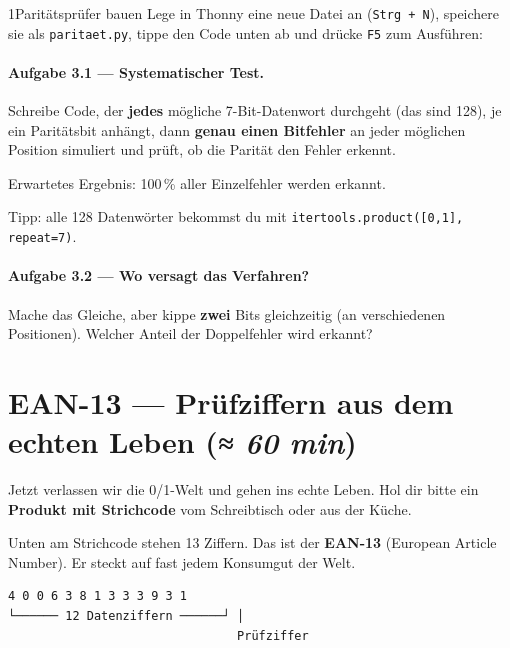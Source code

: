\begin{pythoneinheit}{1}{Paritätsprüfer bauen}
Lege in Thonny eine neue Datei an (\texttt{Strg + N}), speichere sie
als \texttt{paritaet.py}, tippe den Code unten ab und drücke
\texttt{F5} zum Ausführen:


\paragraph{Aufgabe 3.1 — Systematischer Test.}
Schreibe Code, der \textbf{jedes} mögliche 7-Bit-Datenwort durchgeht
(das sind 128), je ein Paritätsbit anhängt, dann \textbf{genau einen
Bitfehler} an jeder möglichen Position simuliert und prüft, ob die
Parität den Fehler erkennt.

Erwartetes Ergebnis: 100\,\% aller Einzelfehler werden erkannt.


Tipp: alle 128 Datenwörter bekommst du mit
\texttt{itertools.product([0,1], repeat=7)}.

\paragraph{Aufgabe 3.2 — Wo versagt das Verfahren?}
Mache das Gleiche, aber kippe \textbf{zwei} Bits gleichzeitig (an
verschiedenen Positionen). Welcher Anteil der Doppelfehler wird
erkannt?
\end{pythoneinheit}

\section{EAN-13 — Prüfziffern aus dem echten Leben \normalfont(\textit{≈ 60 min})}

Jetzt verlassen wir die 0/1-Welt und gehen ins echte Leben. Hol dir
bitte ein \textbf{Produkt mit Strichcode} vom Schreibtisch oder aus
der Küche.

Unten am Strichcode stehen 13 Ziffern. Das ist der \textbf{EAN-13}
(European Article Number). Er steckt auf fast jedem Konsumgut der
Welt.

\begin{verbatim}
4 0 0 6 3 8 1 3 3 3 9 3 1
└────── 12 Datenziffern ──────┘ │
                                Prüfziffer
\end{verbatim}

